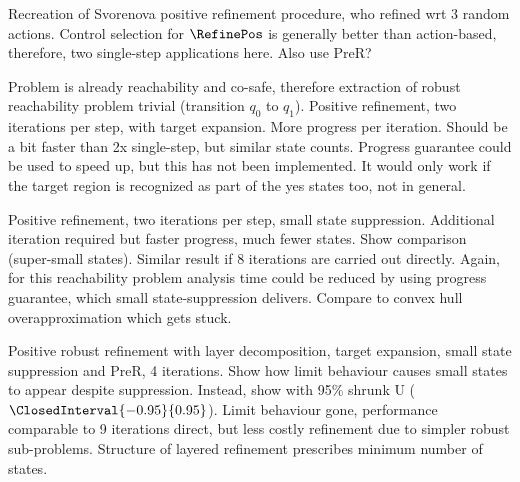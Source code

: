     Recreation of Svorenova positive refinement procedure, who refined wrt 3 random actions.
    Control selection for $\RefinePos$ is generally better than action-based, therefore, two single-step applications here.
    Also use PreR?

    Problem is already reachability and co-safe, therefore extraction of robust reachability problem trivial (transition $q_0$ to $q_1$).
    Positive refinement, two iterations per step, with target expansion.
    More progress per iteration.
    Should be a bit faster than 2x single-step, but similar state counts.
    Progress guarantee could be used to speed up, but this has not been implemented.
    It would only work if the target region is recognized as part of the yes states too, not in general.

    Positive refinement, two iterations per step, small state suppression.
    Additional iteration required but faster progress, much fewer states.
    Show comparison (super-small states).
    Similar result if 8 iterations are carried out directly.
    Again, for this reachability problem analysis time could be reduced by using progress guarantee, which small state-suppression delivers.
    Compare to convex hull overapproximation which gets stuck.

\stopsubsection


\startsubsection[title={Positive Robust Refinement with Layer Decomposition},reference=sec:cases-integrator-layered]



    Positive robust refinement with layer decomposition, target expansion, small state suppression and PreR, 4 iterations.
    Show how limit behaviour causes small states to appear despite suppression.
    Instead, show with 95\% shrunk U ($\ClosedInterval{-0.95}{0.95}$).
    Limit behaviour gone, performance comparable to 9 iterations direct, but less costly refinement due to simpler robust sub-problems.
    Structure of layered refinement prescribes minimum number of states.

